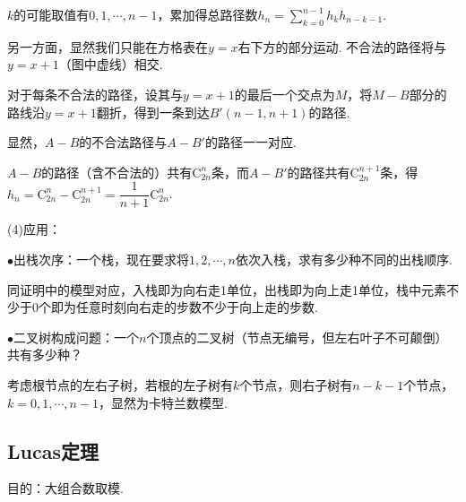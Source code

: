 \documentclass[a4paper]{article}
\newcommand{\hei}{\CJKfamily{hei}}
\def\bkh{\!\!（}
\def\ekh{）\!\!}
\def\C{\mathrm{C}}
\def\dou{，\!\!}
\begin{document}
    $k$的可能取值有$0,1,\cdots,n-1$\dou 累加得总路径数$\displaystyle h_n=\sum_{k=0}^{n-1}h_kh_{n-k-1}$.

    \begin{center}
    \end{center}

    另一方面\dou 显然我们只能在方格表在$y=x$右下方的部分运动. 不合法的路径将与$y=x+1$\bkh 图中虚线\ekh 相交.

    对于每条不合法的路径\dou 设其与$y=x+1$的最后一个交点为$M$\dou 将$M-B$部分的路线沿$y=x+1$翻折\dou 得到一条到达$B'(n-1,n+1)$的路径.

    显然\dou $A-B$的不合法路径与$A-B'$的路径一一对应.

    $A-B$的路径\bkh 含不合法的\ekh 共有$\C_{2n}^n$条\dou 而$A-B'$的路径共有$\C_{2n}^{n+1}$条\dou 得$h_n=\C_{2n}^n-\C_{2n}^{n+1}=\dfrac{1}{n+1}\C_{2n}^n$.

    (4)应用：\!\!

    $\bullet$出栈次序：\!\!一个栈\dou 现在要求将$1,2,\cdots,n$依次入栈\dou 求有多少种不同的出栈顺序.

    同证明中的模型对应\dou 入栈即为向右走1单位\dou 出栈即为向上走1单位\dou 栈中元素不少于0个即为任意时刻向右走的步数不少于向上走的步数.

    $\bullet$二叉树构成问题：\!\!一个$n$个顶点的二叉树\bkh 节点无编号\dou 但左右叶子不可颠倒\ekh 共有多少种？

    考虑根节点的左右子树\dou 若根的左子树有$k$个节点\dou 则右子树有$n-k-1$个节点\dou $k=0,1,\cdots,n-1$\dou 显然为卡特兰数模型.

    \subsection{Lucas定理}

    {\hei 目的：\!\!}大组合数取模.
\end{document}
